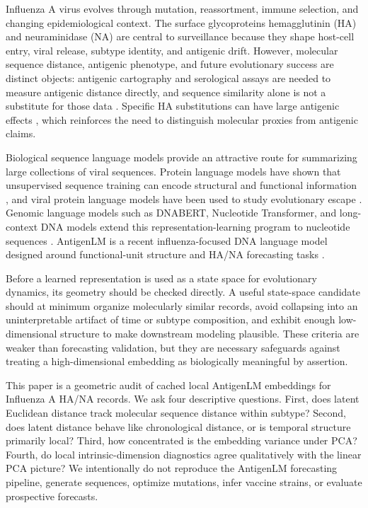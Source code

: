 \documentclass[11pt]{article}
\begin{document}
Influenza A virus evolves through mutation, reassortment, immune selection, and changing epidemiological context. The surface glycoproteins hemagglutinin (HA) and neuraminidase (NA) are central to surveillance because they shape host-cell entry, viral release, subtype identity, and antigenic drift. However, molecular sequence distance, antigenic phenotype, and future evolutionary success are distinct objects: antigenic cartography and serological assays are needed to measure antigenic distance directly, and sequence similarity alone is not a substitute for those data \cite{smith2004mapping,bedford2014integrating}. Specific HA substitutions can have large antigenic effects \cite{koel2013substitutions}, which reinforces the need to distinguish molecular proxies from antigenic claims.

Biological sequence language models provide an attractive route for summarizing large collections of viral sequences. Protein language models have shown that unsupervised sequence training can encode structural and functional information \cite{rives2021biological}, and viral protein language models have been used to study evolutionary escape \cite{hie2021viral}. Genomic language models such as DNABERT, Nucleotide Transformer, and long-context DNA models extend this representation-learning program to nucleotide sequences \cite{ji2021dnabert,dallatorre2025nucleotide,nguyen2023hyenadna}. AntigenLM is a recent influenza-focused DNA language model designed around functional-unit structure and HA/NA forecasting tasks \cite{pei2026antigenlm}.

Before a learned representation is used as a state space for evolutionary dynamics, its geometry should be checked directly. A useful state-space candidate should at minimum organize molecularly similar records, avoid collapsing into an uninterpretable artifact of time or subtype composition, and exhibit enough low-dimensional structure to make downstream modeling plausible. These criteria are weaker than forecasting validation, but they are necessary safeguards against treating a high-dimensional embedding as biologically meaningful by assertion.

This paper is a geometric audit of cached local AntigenLM embeddings for Influenza A HA/NA records. We ask four descriptive questions. First, does latent Euclidean distance track molecular sequence distance within subtype? Second, does latent distance behave like chronological distance, or is temporal structure primarily local? Third, how concentrated is the embedding variance under PCA? Fourth, do local intrinsic-dimension diagnostics agree qualitatively with the linear PCA picture? We intentionally do not reproduce the AntigenLM forecasting pipeline, generate sequences, optimize mutations, infer vaccine strains, or evaluate prospective forecasts.
\end{document}
